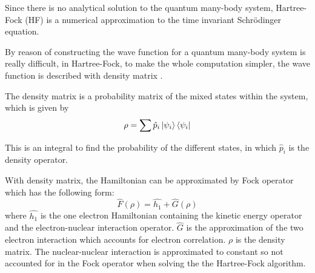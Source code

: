 \documentclass[twoside]{article}
\begin{document}



Since there is no analytical solution to the quantum many-body system, Hartree-Fock (HF) is a numerical approximation to the time invariant Schrödinger equation. 


By reason of constructing the wave function for a quantum many-body system is really difficult, in Hartree-Fock, to make the whole computation simpler, the wave function is described with density matrix . 



The density matrix is a probability matrix of the mixed states within the system, which is given by
\[
\rho = \sum\hat{p}_i\ket{\psi_i}\bra{\psi_i}
\]


This is an integral to find the probability of the different states, in which $\hat{p}_i$ is the density operator. 

With density matrix, the Hamiltonian can be approximated by Fock operator which has the following form:
\[
\hat{F}(\rho) = \hat{h_1} + \hat{G}(\rho)
\]
where $\hat{h_1}$ is the one electron Hamiltonian containing the kinetic energy operator and the electron-nuclear interaction operator. $\hat{G}$ is the approximation of the two electron interaction which accounts for electron correlation. $\rho$ is the density matrix. The nuclear-nuclear interaction is approximated to constant so not accounted for in the Fock operator when solving the the Hartree-Fock algorithm. %
\end{document}

